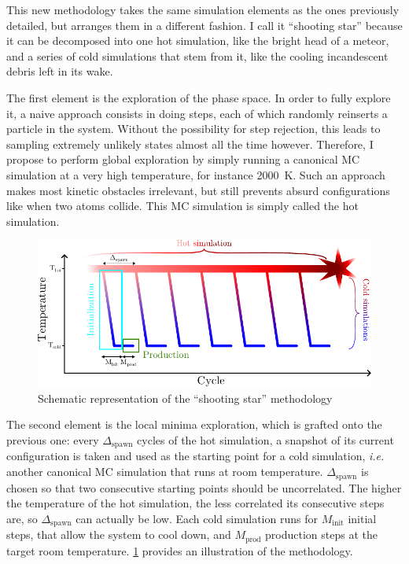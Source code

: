 \documentclass[main.tex]{subfiles}
\begin{document}
This new methodology takes the same simulation elements as the ones previously detailed, but arranges them in a different fashion. I call it ``shooting star'' because it can be decomposed into one hot simulation, like the bright head of a meteor, and a series of cold simulations that stem from it, like the cooling incandescent debris left in its wake.

The first element is the exploration of the phase space. In order to fully explore it, a naive approach consists in doing steps, each of which randomly reinserts a particle in the system. Without the possibility for step rejection, this leads to sampling extremely unlikely states almost all the time however. Therefore, I propose to perform global exploration by simply running a canonical MC simulation at a very high temperature, for instance \qty{2000}{K}. Such an approach makes most kinetic obstacles irrelevant, but still prevents absurd configurations like when two atoms collide. This MC simulation is simply called the hot simulation.

\begin{figure}
	\centering
	\includegraphics[width=0.9\linewidth]{figures/cations/shootingstar.pdf}
	\caption{Schematic representation of the ``shooting star'' methodology}\label{fig:shootingstar}
\end{figure}

The second element is the local minima exploration, which is grafted onto the previous one: every $\Delta_{\text{spawn}}$ cycles of the hot simulation, a snapshot of its current configuration is taken and used as the starting point for a cold simulation, \textit{i.e.} another canonical MC simulation that runs at room temperature. $\Delta_{\text{spawn}}$ is chosen so that two consecutive starting points should be uncorrelated. The higher the temperature of the hot simulation, the less correlated its consecutive steps are, so $\Delta_{\text{spawn}}$ can actually be low. Each cold simulation runs for $M_\text{init}$ initial steps, that allow the system to cool down, and $M_\text{prod}$ production steps at the target room temperature. \cref{fig:shootingstar} provides an illustration of the methodology.
\end{document}
